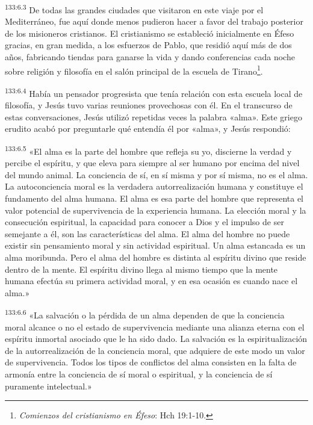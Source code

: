 \par 
\textsuperscript{133:6.3} De todas las grandes ciudades que visitaron en este viaje por el Mediterráneo, fue aquí donde menos pudieron hacer a favor del trabajo posterior de los misioneros cristianos. El cristianismo se estableció inicialmente en Éfeso gracias, en gran medida, a los esfuerzos de Pablo, que residió aquí más de dos años, fabricando tiendas para ganarse la vida y dando conferencias cada noche sobre religión y filosofía en el salón principal de la escuela de Tirano\footnote{\textit{Comienzos del cristianismo en Éfeso}: Hch 19:1-10.}.

\par 
\textsuperscript{133:6.4} Había un pensador progresista que tenía relación con esta escuela local de filosofía, y Jesús tuvo varias reuniones provechosas con él. En el transcurso de estas conversaciones, Jesús utilizó repetidas veces la palabra «alma». Este griego erudito acabó por preguntarle qué entendía él por «alma», y Jesús respondió:

\par 
\textsuperscript{133:6.5} «El alma es la parte del hombre que refleja su yo, discierne la verdad y percibe el espíritu, y que eleva para siempre al ser humano por encima del nivel del mundo animal. La conciencia de sí, en sí misma y por sí misma, no es el alma. La autoconciencia moral es la verdadera autorrealización humana y constituye el fundamento del alma humana. El alma es esa parte del hombre que representa el valor potencial de supervivencia de la experiencia humana. La elección moral y la consecución espiritual, la capacidad para conocer a Dios y el impulso de ser semejante a él, son las características del alma. El alma del hombre no puede existir sin pensamiento moral y sin actividad espiritual. Un alma estancada es un alma moribunda. Pero el alma del hombre es distinta al espíritu divino que reside dentro de la mente. El espíritu divino llega al mismo tiempo que la mente humana efectúa su primera actividad moral, y en esa ocasión es cuando nace el alma.»

\par 
\textsuperscript{133:6.6} «La salvación o la pérdida de un alma dependen de que la conciencia moral alcance o no el estado de supervivencia mediante una alianza eterna con el espíritu inmortal asociado que le ha sido dado. La salvación es la espiritualización de la autorrealización de la conciencia moral, que adquiere de este modo un valor de supervivencia. Todos los tipos de conflictos del alma consisten en la falta de armonía entre la conciencia de sí moral o espiritual, y la conciencia de sí puramente intelectual.»

